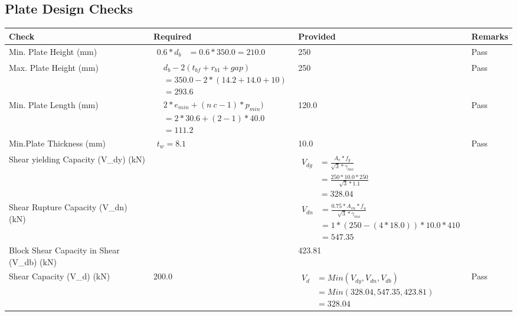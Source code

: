\documentclass{article}%
\begin{document}
\subsection{Plate Design Checks}%
\label{subsec:PlateDesignChecks}%
\renewcommand{\arraystretch}{1.2}%
\begin{longtable}{|p{4cm}|p{5cm}|p{5.5cm}|p{1.5cm}|}%
\hline%
\rowcolor{OsdagGreen}%
Check&Required&Provided&Remarks\\%
\hline%
\endhead%
\hline%
Min. Plate Height (mm)&$\begin{aligned}0.6 * d_b&= 0.6 * 350.0=210.0\end{aligned}$&250&Pass\\%
\hline%
Max. Plate Height (mm)&$\begin{aligned} &d_b - 2 (t_{bf} + r_{b1} + gap)\\ &=350.0- 2* (14.2+14.0+ 10)\\ &=293.6\end{aligned}$&250&Pass\\%
\hline%
Min. Plate Length (mm)&$\begin{aligned} &2*e_{min} + (n~c-1) * p_{min})\\ &=2*30.6+(2-1) * 40.0\\ &=111.2\end{aligned}$&120.0&Pass\\%
\hline%
Min.Plate Thickness (mm)&$\begin{aligned} t_w=8.1\end{aligned}$&10.0&Pass\\%
\hline%
Shear yielding Capacity (V\_dy) (kN)&&$\begin{aligned} V_{dg} &= \frac{A_v*f_y}{\sqrt{3}*\gamma_{mo}}\\ &=\frac{250*10.0*250}{\sqrt{3}*1.1}\\ &=328.04\end{aligned}$&\\%
\hline%
Shear Rupture Capacity (V\_dn) (kN)&&$\begin{aligned} V_{dn} &= \frac{0.75*A_{vn}*f_u}{\sqrt{3}*\gamma_{mo}}\\ &=1*(250-(4*18.0))*10.0*410\\ &=547.35\end{aligned}$&\\%
\hline%
Block Shear Capacity in Shear (V\_db) (kN)&&423.81&\\%
\hline%
Shear Capacity (V\_d) (kN)&200.0&$\begin{aligned} V_d &= Min(V_{dy},V_{dn},V_{db})\\ &= Min(328.04,547.35,423.81)\\ &=328.04\end{aligned}$&Pass\\%

\end{longtable}
\end{document}

